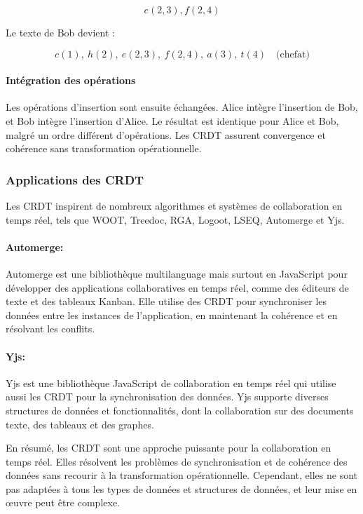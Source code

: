 \begin{equation}
    e(2, 3), f(2, 4)
\end{equation}

Le texte de Bob devient :

\begin{equation}
    c(1), \ h(2), \ e(2, 3), \ f(2, 4), \ a(3), \ t(4) \quad \text{(chefat)}
\end{equation}

\paragraph{Intégration des opérations}
Les opérations d'insertion sont ensuite échangées. Alice intègre l'insertion de Bob, et Bob intègre l'insertion d'Alice. Le résultat est identique pour Alice et Bob, malgré un ordre différent d'opérations. Les CRDT assurent convergence et cohérence sans transformation opérationnelle.

\subsubsection{Applications des \gls{CRDT}}
Les \gls{CRDT} inspirent de nombreux algorithmes et systèmes de collaboration en temps réel, tels que WOOT, Treedoc, RGA, Logoot, LSEQ, Automerge et Yjs.

\paragraph{Automerge\cite{hardenbergAutomerge2023}: } Automerge est une bibliothèque multilanguage mais surtout en JavaScript pour développer des applications collaboratives en temps réel, comme des éditeurs de texte et des tableaux Kanban. Elle utilise des \gls{CRDT} pour synchroniser les données entre les instances de l'application, en maintenant la cohérence et en résolvant les conflits.

\paragraph{Yjs\cite{nicolaescuYjsFrameworkRealTime2015}: } Yjs est une bibliothèque JavaScript de collaboration en temps réel qui utilise aussi les \gls{CRDT} pour la synchronisation des données. Yjs supporte diverses structures de données et fonctionnalités, dont la collaboration sur des documents texte, des tableaux et des graphes.

En résumé, les \gls{CRDT} sont une approche puissante pour la collaboration en temps réel. Elles résolvent les problèmes de synchronisation et de cohérence des données sans recourir à la transformation opérationnelle. Cependant, elles ne sont pas adaptées à tous les types de données et structures de données, et leur mise en \oe{}uvre peut être complexe.

